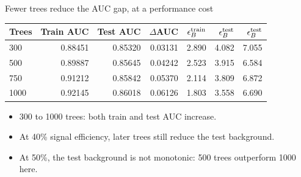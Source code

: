 \begin{frame}[plain,label=p1_20260920]{}
\titlepage
\end{frame}

\begin{frame}[label=p3_20260920]{Fewer trees reduce the AUC gap, at a performance cost}

\begin{center}\small
\begin{tabular}{@{}lrrrrrr@{}}\toprule
Trees & Train AUC & Test AUC & $\Delta$AUC & $\epsilon_B^{\rm train}$ & $\epsilon_B^{\rm test}$ & $\epsilon_B^{\rm test}$\\\midrule
300 & 0.88451 & 0.85320 & 0.03131 & 2.890 & 4.082 & 7.055\\
500 & 0.89887 & 0.85645 & 0.04242 & 2.523 & 3.915 & 6.584\\
750 & 0.91212 & 0.85842 & 0.05370 & 2.114 & 3.809 & 6.872\\
1000 & 0.92145 & 0.86018 & 0.06126 & 1.803 & 3.558 & 6.690\\
\bottomrule\end{tabular}\end{center}
\par\vspace{0.2em}
\begin{itemize}\item 300 to 1000 trees: both train and test AUC increase.\item At 40\% signal efficiency, later trees still reduce the test background.\item At 50\%, the test background is not monotonic: 500 trees outperform 1000 here.\end{itemize}
\par\vspace{0.2em}

\end{frame}

